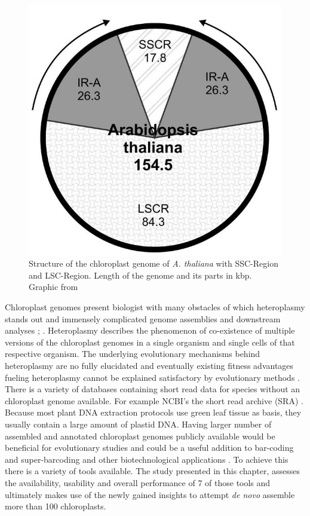 \begin{figure}[H]
\centering
\includegraphics[height=.55\textheight, width=.95\textwidth]{Figures/cpast}
\decoRule
\caption[Structure of a chloroplast genome]{Structure of the chloroplast genome of \textit{A. thaliana} with SSC-Region and LSC-Region. Length of the genome and its parts in kbp. Graphic from \cite{olejniczak2016chloroplasts}}
\label{fig:cpast_genome}
\end{figure}

Chloroplast genomes present biologist with many obstacles of which heteroplasmy stands out and immensely
complicated genome assemblies and downstream analyses \cite{corriveau_1988}; \cite{Chat2002}.  Heteroplasmy
describes the phenomenon of co-existence of multiple versions of the chloroplast genomes in a single organism
and single cells of that respective organism. The underlying evolutionary mechanisms behind heteroplasmy are
no fully elucidated and eventually existing fitness advantages fueling heteroplasmy cannot be explained
satisfactory by evolutionary methods \cite{Scar2016}.  There is a variety of databases containing short read
data for species without an chloroplast genome available. For example NCBI's the short read archive (SRA)
\cite{SRA2010}. Because most plant DNA extraction protocols use green leaf tissue as basis, they usually
contain a large amount of plastid DNA. Having larger number of assembled and annotated chloroplast genomes
publicly available would be beneficial for evolutionary studies and could be a useful addition to bar-coding
and super-barcoding \cite{coissac_barcodes_2016} and other biotechnological applications
\cite{daniell_chloroplast_2016}. To achieve this there is a variety of tools available. The study presented in
this chapter, assesses the availability, usability and overall performance of 7 of those tools and ultimately
makes use of the newly gained insights to attempt \textit{de novo} assemble more than 100 chloroplasts.




